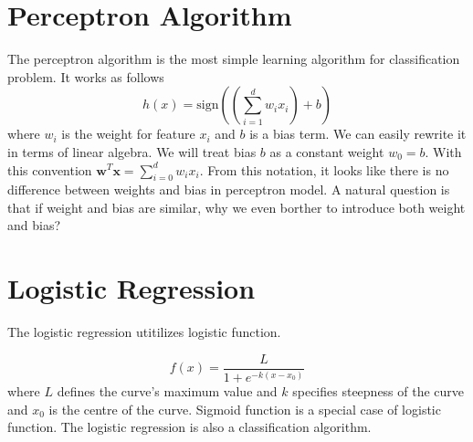 \documentclass[
10pt, %
a4paper, %
oneside, %
headinclude,footinclude, %
BCOR5mm, %
]{scrartcl}
\begin{document}
{\let\thefootnote\relax{}}

{\let\thefootnote\relax{}}


\newpage %


\section{Perceptron Algorithm}
The perceptron algorithm is the most simple learning algorithm for classification problem. It works as follows
\begin{equation}
	h(x) = \mbox{sign} \left( \left(  \sum_{i=1}^{d}w_{i}x_{i} \right) + b \right)  
\end{equation}
where $w_{i}$ is the weight for feature $x_{i}$ and $b$ is a bias term. We can easily rewrite it in terms of linear algebra. We will treat bias $b$ as a constant weight $w_{0} = b$. With this convention $\mathbf{w}^{T} \mathbf{x}=\sum_{i=0}^{d} w_{i}x_{i}$. From this notation, it looks like there is no difference between weights and bias in perceptron model. A natural question is that if weight and bias are similar, why we even borther to introduce both weight and bias? 

\section{Logistic Regression}
The logistic regression utitilizes logistic function. 

\begin{equation}
	f(x) = \frac{L}{1 + e^{-k(x-x_{0})}}
\end{equation}
where $L$ defines the curve's maximum value and $k$ specifies steepness of the curve and $x_{0}$ is the centre of the curve. Sigmoid function is a special case of logistic function. The logistic regression is also a classification algorithm.
\end{document}
